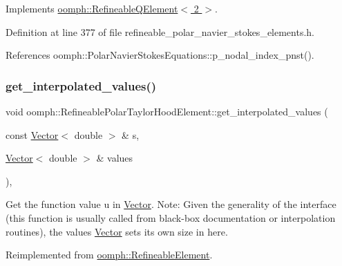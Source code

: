Implements \hyperlink{classoomph_1_1RefineableQElement_3_012_01_4_a01e1eb063dd2c98ebb42d87959ca6b88}{oomph\+::\+Refineable\+Q\+Element$<$ 2 $>$}.



Definition at line 377 of file refineable\+\_\+polar\+\_\+navier\+\_\+stokes\+\_\+elements.\+h.



References oomph\+::\+Polar\+Navier\+Stokes\+Equations\+::p\+\_\+nodal\+\_\+index\+\_\+pnst().

\mbox{\label{classoomph_1_1RefineablePolarTaylorHoodElement_aee28f356ae477c5833075e873d72e0d4}} 
\subsubsection{\texorpdfstring{get\+\_\+interpolated\+\_\+values()}{get\_interpolated\_values()}\hspace{0.1cm}{\footnotesize\ttfamily [1/2]}}
{\footnotesize\ttfamily void oomph\+::\+Refineable\+Polar\+Taylor\+Hood\+Element\+::get\+\_\+interpolated\+\_\+values (\begin{DoxyParamCaption}\item[{const \hyperlink{classoomph_1_1Vector}{Vector}$<$ double $>$ \&}]{s,  }\item[{\hyperlink{classoomph_1_1Vector}{Vector}$<$ double $>$ \&}]{values }\end{DoxyParamCaption})\hspace{0.3cm}{\ttfamily [inline]}, {\ttfamily [virtual]}}



Get the function value u in \hyperlink{classoomph_1_1Vector}{Vector}. Note\+: Given the generality of the interface (this function is usually called from black-\/box documentation or interpolation routines), the values \hyperlink{classoomph_1_1Vector}{Vector} sets its own size in here. 



Reimplemented from \hyperlink{classoomph_1_1RefineableElement_ad9a4f92880668a2373326d8306365c43}{oomph\+::\+Refineable\+Element}.



